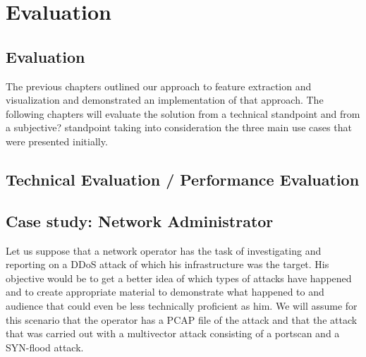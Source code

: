 




\chapter{Evaluation}

\section{Evaluation}
The previous chapters outlined our approach to feature extraction and visualization and demonstrated an implementation of that approach. The following chapters will evaluate the solution from a technical standpoint and from a subjective? standpoint taking into consideration the three main use cases that were presented initially.
\section{Technical Evaluation / Performance Evaluation}
\section{Case study: Network Administrator}
Let us suppose that a network operator has the task of investigating and reporting on a DDoS attack of which his infrastructure was the target. His objective would be to get a better idea of which types of attacks have happened and to create appropriate material to demonstrate what happened to and audience that could even be less technically proficient as him. We will assume for this scenario that the operator has a PCAP file of the attack and that the attack that was carried out with a multivector attack consisting of a portscan and a SYN-flood attack.

